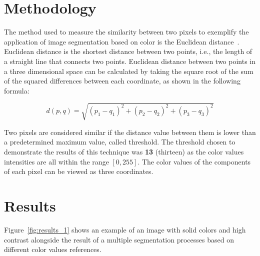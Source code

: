 \documentclass{bmvc2k}
\begin{document}
\section{Methodology}
\label{sec:method}

The method used to measure the similarity between two pixels to exemplify the application of image segmentation based on color is the Euclidean distance~\cite{wiki-euclidean-distance}. Euclidean distance is the shortest distance between two points, i.e., the length of a straight line that connects two points. Euclidean distance between two points in a three dimensional space can be calculated by taking the square root of the sum of the squared differences between each coordinate, as shown in the following formula:

\[ d(p, q) = \sqrt{(p_1 - q_1)^2 + (p_2 - q_2)^2 + (p_3 - q_3)^2} \]

Two pixels are considered similar if the distance value between them is lower than a predetermined maximum value, called threshold. The threshold chosen to demonstrate the results of this technique was \textbf{13} (thirteen) as the color values intensities are all within the range \([0, 255] \). The color values of the components of each pixel can be viewed as three coordinates.

\section{Results}
\label{sec:results}

Figure~\ref{fig:results_1} shows an example of an image with solid colors and high contrast alongside the result of a multiple segmentation processes based on different color values references.
\end{document}
